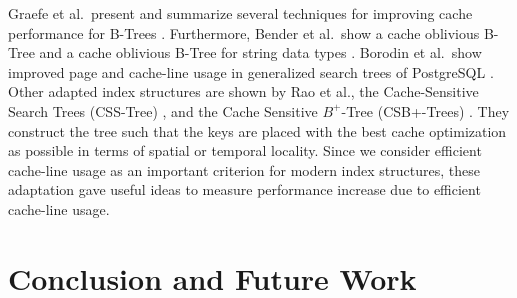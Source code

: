 \documentclass[runningheads,a4paper]{llncs}
\begin{document}
Graefe et al.\ present and summarize several techniques for improving cache performance for B-Trees \cite{graefe2001b}. Furthermore, Bender et al.\ show a cache oblivious B-Tree \cite{bender2000cache} and a cache oblivious B-Tree for string data types \cite{bender2006cache}. Borodin et al.\ show improved page and cache-line usage in generalized search trees of PostgreSQL \cite{borodin2017optimization}. Other adapted index structures are shown by Rao et al., the Cache-Sensitive Search Trees (CSS-Tree) \cite{rao1999cache}, and the Cache Sensitive $B^+$-Tree (CSB+-Trees) \cite{rao2000making}. They construct the tree such that the keys are placed with the best cache optimization as possible in terms of spatial or temporal locality. Since we consider efficient cache-line usage as an important criterion for modern index structures, these adaptation gave useful ideas to measure performance increase due to efficient cache-line usage. 




\section{Conclusion and Future Work}
\end{document}
